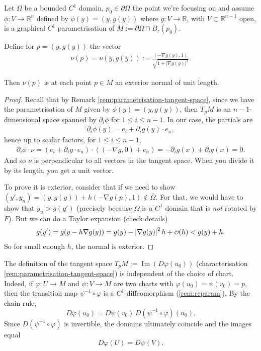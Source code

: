 \begin{lemma}\label{lem:ext-unit-norm}
	Let $\Omega$ be a bounded $C^{1}$ domain, $p_{0} \in \partial \Omega$ the point we're focusing on and assume $\phi: V \to \mathbb{R}^{n}$ defined by $\phi(y) = (y, g(y))$ where $g: V \to \mathbb{R}$, with $V \subset \mathbb{R}^{n-1}$ open, is a graphical $C^{1}$ parametrisation of $M := \partial \Omega \cap B_{r}(p_{0})$.

	Define for $p = (y,g(y))$ the vector
	\begin{align*}
		\nu(p) = \nu(y, g(y)) := \frac{(-\nabla g(y), 1)}{\sqrt{1 + \left| \nabla g(y) \right|^{2}}}.
	\end{align*}

	Then $\nu(p)$ is at each point $p \in M$ an exterior normal of unit length.
\end{lemma}
\begin{proof}
	Recall that by Remark \ref{rem:parametrisation-tangent-space}, since we have the parametrisation of $M$ given by $\phi(y) = (y, g(y))$, then $T_{p}M$ is an $n-1$-dimensional space spanned by $\partial_{i} \phi$ for $1 \leq i \leq n-1$. In our case, the partials are
	\begin{align*}
		\partial_{i} \phi(y) = e_{i} + \partial_{i} g (y) \cdot e_{n},
	\end{align*}
	hence up to scalar factors, for $1 \leq i \leq n-1$,
	\begin{align*}
		\partial_{i} \phi \cdot \nu = (e_{i} + \partial_{i} g \cdot  e_{n}) \cdot ( (-\nabla g, 0) + e_{n}) = -\partial_{i} g(x) + \partial_{i} g(x) = 0.
	\end{align*}
	And so $\nu$ is perpendicular to all vectors in the tangent space. When you divide it by its length, you get a unit vector.

	To prove it is exterior, consider that if we need to show $(y', y_{n}) = (y,g(y)) + h (-\nabla g(p), 1) \not \in \overline{ \Omega } $. For that, we would have to show that $y_{n} > g(y')$ (precisely because $\Omega$ is a $C^{1}$ domain that is \textit{not} rotated by $F$). But we can do a Taylor expansion (check details)
	\begin{align*}
		g(y') = g(y - h \nabla g(y)) = g(y) - \left| \nabla g(y) \right|^{2} h + \smalO(h) < g(y) + h.
	\end{align*}
	So for small enough $h$, the normal is exterior.
\end{proof}

\begin{remark}
	The definition of the tangent space $T_p M := \operatorname{Im}(D\varphi(u_0))$ (characterisation \ref{rem:parametrisation-tangent-space}) is independent of the choice of chart. Indeed, if $\varphi: U \to M$ and $\psi: V \to M$ are two charts with $\varphi(u_0)=\psi(v_0)=p$, then the transition map $\psi^{-1}\circ\varphi$ is a $C^1$-diffeomorphism (\ref{rem:reparam}). By the chain rule,
	\[
		D\varphi(u_0) = D\psi(v_0)\, D(\psi^{-1}\circ\varphi)(u_0).
	\]
	Since $D(\psi^{-1}\circ\varphi)$ is invertible, the domains ultimately coincide and the images equal
	\[
		D\varphi(U) = D\psi(V).
	\]
\end{remark}

